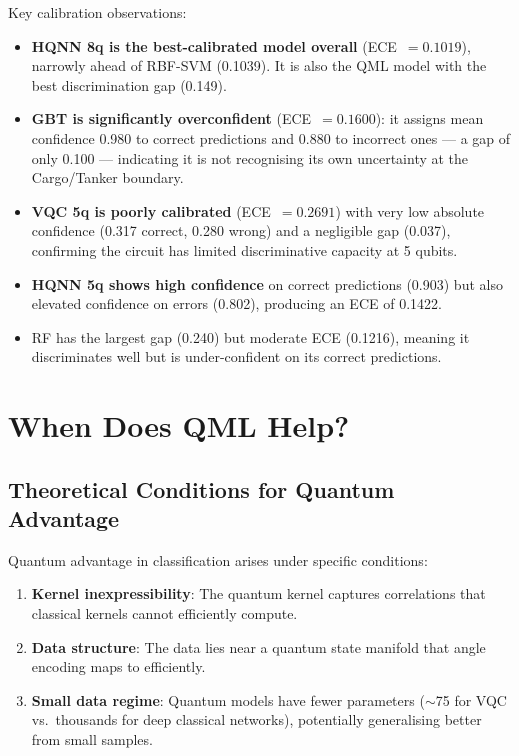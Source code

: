 \documentclass[journal]{IEEEtran}
\begin{document}
Key calibration observations:
\begin{itemize}
  \item \textbf{HQNN 8q is the best-calibrated model overall} (ECE~$= 0.1019$),
        narrowly ahead of RBF-SVM (0.1039). It is also the QML model with
        the best discrimination gap (0.149).
  \item \textbf{GBT is significantly overconfident} (ECE~$= 0.1600$):
        it assigns mean confidence 0.980 to correct predictions and 0.880
        to incorrect ones — a gap of only 0.100 — indicating it is not
        recognising its own uncertainty at the Cargo/Tanker boundary.
  \item \textbf{VQC 5q is poorly calibrated} (ECE~$= 0.2691$) with very
        low absolute confidence (0.317 correct, 0.280 wrong) and a negligible
        gap (0.037), confirming the circuit has limited discriminative capacity
        at 5 qubits.
  \item \textbf{HQNN 5q shows high confidence} on correct predictions (0.903)
        but also elevated confidence on errors (0.802), producing an ECE of 0.1422.
  \item RF has the largest gap (0.240) but moderate ECE (0.1216), meaning
        it discriminates well but is under-confident on its correct predictions.
\end{itemize}

\section{When Does QML Help?}
\label{sec:when_qml_helps}

\subsection{Theoretical Conditions for Quantum Advantage}

Quantum advantage in classification arises under specific conditions:
\begin{enumerate}
  \item \textbf{Kernel inexpressibility}: The quantum kernel captures
        correlations that classical kernels cannot efficiently compute.
  \item \textbf{Data structure}: The data lies near a quantum state manifold
        that angle encoding maps to efficiently.
  \item \textbf{Small data regime}: Quantum models have fewer parameters
        ($\sim$75 for VQC vs.\ thousands for deep classical networks),
        potentially generalising better from small samples.
\end{enumerate}
\end{document}
